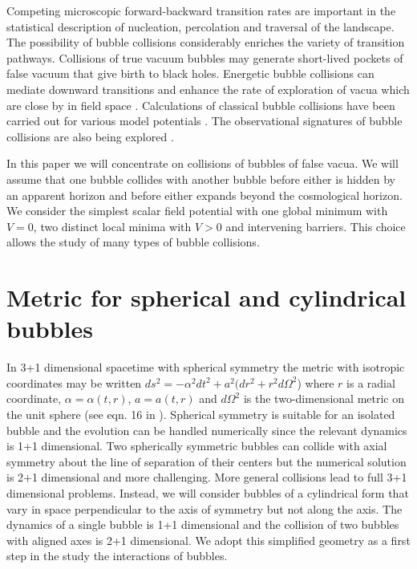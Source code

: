 \documentclass[preprintnumbers,eqsecnum,aps,prd,epsf,showpacs,nofootinbib
]{revtex4}
\begin{document}
Competing microscopic forward-backward transition rates are important
in the statistical description of nucleation, percolation and
traversal of the landscape.  The possibility of bubble collisions
considerably enriches the variety of transition pathways. Collisions
of true vacuum bubbles may generate short-lived pockets of false
vacuum \cite{Hawking:1982ga} that give birth to black holes.
Energetic bubble collisions can mediate downward transitions and
enhance the rate of exploration of vacua which are close by in field
space \cite{Easther:2009ft}.  Calculations of classical bubble
collisions have been carried out for various model potentials
\cite{Giblin:2010bd,Hwang:2012pj,Hwang:2014cqa}. The observational
signatures of bubble collisions are also being explored
\cite{Aguirre:2007an,Aguirre:2009ug,Wainwright:2013lea,Wainwright:2014pta,Johnson:2015gma,Kleban:2011pg}.

In this paper we will concentrate on collisions of bubbles of false
vacua. We will assume that one bubble collides with another bubble
before either is hidden by an apparent horizon and before either expands
beyond the cosmological horizon. We consider the simplest scalar field
potential with one global minimum with $V=0$, two distinct local
minima with $V>0$ and intervening barriers. This choice allows the
study of many types of bubble collisions.

\section{Metric for spherical and cylindrical bubbles}
In 3+1 dimensional spacetime with spherical symmetry the metric with
isotropic coordinates may be written $ds^2 = -\alpha^2 dt^2 + a^2
(dr^2 + r^2 d\Omega^2$) where $r$ is a radial coordinate,
$\alpha=\alpha(t,r)$, $a=a(t,r)$ and $d\Omega^2$ is the
two-dimensional metric on the unit sphere (see eqn. 16 in
\cite{Parry:2012ku}). Spherical symmetry is suitable for an isolated
bubble and the evolution can be handled numerically since the relevant
dynamics is 1+1 dimensional.  Two spherically symmetric bubbles can
collide with axial symmetry about the line of separation of their
centers but the numerical solution is 2+1 dimensional and more
challenging. More general collisions lead to full 3+1 dimensional
problems.  Instead, we will consider bubbles of a cylindrical form
that vary in space perpendicular to the axis of symmetry but not along
the axis.  The dynamics of a single bubble is 1+1 dimensional and the
collision of two bubbles with aligned axes is 2+1 dimensional. We
adopt this simplified geometry as a first step in the study the
interactions of bubbles.
\end{document}
